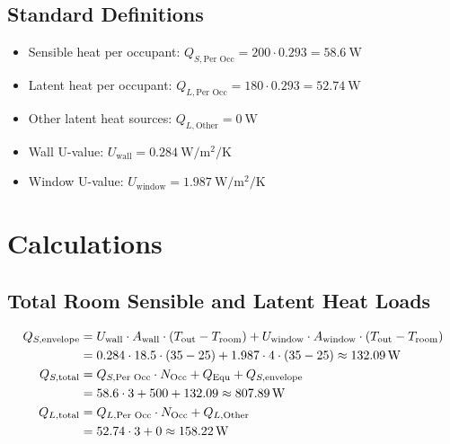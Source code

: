 \documentclass[12pt]{article}
\begin{document}
\subsection{Standard Definitions}
\begin{itemize}
    \item Sensible heat per occupant: \( Q_{S,\text{Per Occ}} = 200 \cdot 0.293 = \SI{58.6}{\watt} \)
    \item Latent heat per occupant: \( Q_{L,\text{Per Occ}} = 180 \cdot 0.293 = \SI{52.74}{\watt} \)
    \item Other latent heat sources: \( Q_{L,\text{Other}} = \SI{0}{\watt} \)
    \item Wall U-value: \( U_{\text{wall}} = \SI{0.284}{\watt\per\meter\squared\per\kelvin} \)
    \item Window U-value: \( U_{\text{window}} = \SI{1.987}{\watt\per\meter\squared\per\kelvin} \)
\end{itemize}

\section{Calculations}

\subsection{Total Room Sensible and Latent Heat Loads}
\begin{align}
    Q_{S,\text{envelope}} &= U_{\text{wall}} \cdot A_{\text{wall}} \cdot (T_{\text{out}} - T_{\text{room}}) + U_{\text{window}} \cdot A_{\text{window}} \cdot (T_{\text{out}} - T_{\text{room}}) \notag \\
    &= 0.284 \cdot 18.5 \cdot (35 - 25) + 1.987 \cdot 4 \cdot (35 - 25) \approx \SI{132.09}{\watt} \\
    Q_{S,\text{total}} &= Q_{S,\text{Per Occ}} \cdot N_{\text{Occ}} + Q_{\text{Equ}} + Q_{S,\text{envelope}} \notag \\
    &= 58.6 \cdot 3 + 500 + 132.09 \approx \SI{807.89}{\watt} \\
    Q_{L,\text{total}} &= Q_{L,\text{Per Occ}} \cdot N_{\text{Occ}} + Q_{L,\text{Other}} \notag \\
    &= 52.74 \cdot 3 + 0 \approx \SI{158.22}{\watt}
\end{align}
\end{document}
